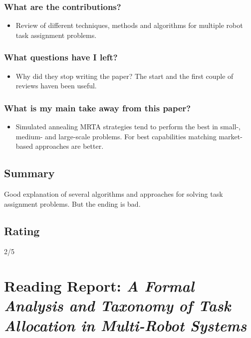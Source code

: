 \documentclass{article}
\begin{document}
\subsubsection*{What are the contributions?}
\begin{itemize}
    \item Review of different techniques, methods and algorithms for multiple robot task assignment problems.
\end{itemize}
\subsubsection*{What questions have I left?}
\begin{itemize}
    \item Why did they stop writing the paper? The start and the first couple of reviews haven been useful.
\end{itemize}
\subsubsection*{What is my main take away from this paper?}
\begin{itemize}
    \item Simulated annealing MRTA strategies tend to perform the best in small-, medium- and large-scale problems. For best capabilities matching market-based approaches are better.
\end{itemize}

\subsection*{Summary}
Good explanation of several algorithms and approaches for solving task assignment problems. But the ending is bad.
\subsection*{Rating}
2/5

\section{Reading Report: \emph{A Formal Analysis and Taxonomy of Task Allocation in Multi-Robot Systems
}}
\cite{Gerkey2004}
\end{document}
